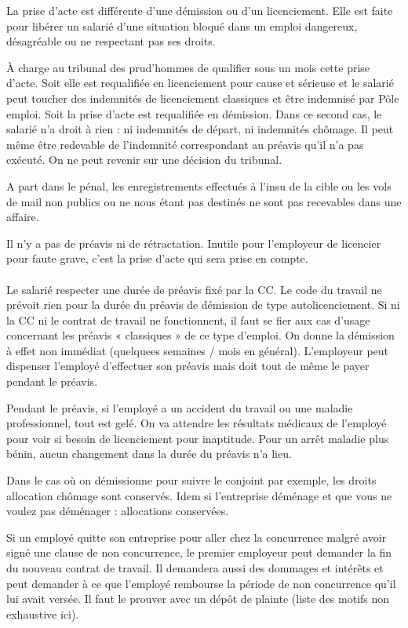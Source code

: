 La prise d'acte est différente d'une démission ou d'un licenciement.
Elle est faite pour libérer un salarié d’une situation bloqué dans un emploi dangereux, désagréable ou ne respectant pas ses droits.

À charge au tribunal des prud’hommes de qualifier sous un mois cette prise d’acte.
Soit elle est requalifiée en licenciement pour cause et sérieuse et le salarié peut toucher des indemnités de licenciement classiques et être indemnisé par Pôle emploi.
Soit la prise d’acte est requalifiée en démission.
Dans ce second cas, le salarié n’a droit à rien : ni indemnités de départ, ni indemnités chômage.
Il peut même être redevable de l’indemnité correspondant au préavis qu’il n’a pas exécuté.
On ne peut revenir sur une décision du tribunal.

A part dans le pénal, les enregistrements effectués à l’insu de la cible ou les vols de mail non publics ou ne nous étant pas destinés ne sont pas recevables dans une affaire.

Il n'y a pas de préavis ni de rétractation.
Inutile pour l’employeur de licencier pour faute grave, c’est la prise d’acte qui sera prise en compte.

\paragraph{}
Le salarié respecter une durée de préavis fixé par la CC.
Le code du travail ne prévoit rien pour la durée du préavis de démission de type autolicenciement.
Si ni la CC ni le contrat de travail ne fonctionnent, il faut se fier aux cas d’usage concernant les préavis « classiques » de ce type d’emploi.
On donne la démission à effet non immédiat (quelquees semaines / mois en général).
L’employeur peut dispenser l’employé d’effectuer son préavis mais doit tout de même le payer pendant le préavis.

Pendant le préavis, si l’employé a un accident du travail ou une maladie professionnel, tout est gelé.
On va attendre les résultats médicaux de l’employé pour voir si besoin de licenciement pour inaptitude.
Pour un arrêt maladie plus bénin, aucun changement dans la durée du préavis n'a lieu.

Dans le cas où on démissionne pour suivre le conjoint par exemple, les droits allocation chômage sont conservés.
Idem si l’entreprise déménage et que vous ne voulez pas déménager : allocations conservées.

Si un employé quitte son entreprise pour aller chez la concurrence malgré avoir signé une clause de non concurrence, le premier employeur peut demander la fin du nouveau contrat de travail.
Il demandera aussi des dommages et intérêts et peut demander à ce que l’employé rembourse la période de non concurrence qu’il lui avait versée.
Il faut le prouver avec un dépôt de plainte (liste des motifs non exhaustive ici).

